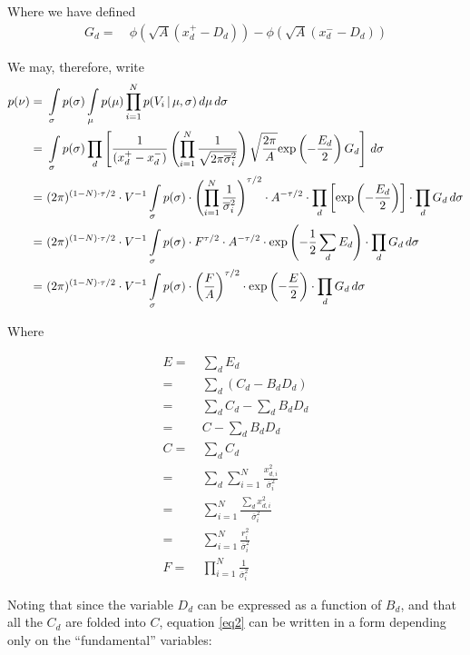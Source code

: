 \documentclass{article}
\newcommand{\sig}{\overline{\sigma}_i}
\newcommand{\eq}{=&\ }
\newcommand{\ints}{\int\displaylimits_\sigma}
\newcommand{\intm}{\int\displaylimits_\mu}
\begin{document}
Where we have defined
\begin{align}
  G_d \eq \phi\left(\sqrt{A}(x_d^+-D_d)\right) - \phi\left(\sqrt{A}(x_d^--D_d)\right)
\end{align}

We may, therefore, write
\begin{align}
  p( \nu ) \eq \ints p(\sigma) \intm p(\mu) \prod_{i=1}^{N} p(V_{i}\,|\,\mu,\sigma)\,d\mu\,d\sigma \nonumber \\
           \eq \ints p(\sigma) \prod_d \left[ \frac{1}{(x_d^+ - x_d^-)} \left(\prod_{i=1}^{N} \frac{1}{\sqrt{2\pi\sig^2}}\right)\sqrt{\frac{2\pi}{A}}\text{exp}\left(-\frac{E_d}{2}\right)G_d \right]\,d\sigma \\  
           \eq (2\pi)^{(1-N)\cdot\tau/2} \cdot V^{-1} \ints p(\sigma) \cdot \left(\prod_{i=1}^{N} \frac{1}{\sig^2}\right)^{\tau/2} \cdot A^{-\tau/2} \cdot \prod_d\left[\text{exp}\left(-\frac{E_d}{2}\right)\right] \cdot \prod_d G_d \,d\sigma \\
           \eq (2\pi)^{(1-N)\cdot\tau/2} \cdot V^{-1} \ints p(\sigma) \cdot F^{\tau/2} \cdot A^{-\tau/2} \cdot \text{exp}\left(-\frac{1}{2}\sum_d E_d\right) \cdot \prod_d G_d \,d\sigma \\
           \eq (2\pi)^{(1-N)\cdot\tau/2} \cdot V^{-1} \ints p(\sigma)\cdot\left(\frac{F}{A}\right)^{\tau/2}\cdot\text{exp}\left(-\frac{E}{2}\right) \cdot \prod_d G_d \,d\sigma \label{eq2}
\end{align}

Where

\begin{align}
  E \eq \sum_d E_d \\
    \eq \sum_d (C_d - B_d D_d) \\
    \eq \sum_d C_d - \sum_d B_d D_d \\
    \eq C - \sum_d B_d D_d \\
  C \eq \sum_d C_d \\
    \eq \sum_d \sum_{i=1}^{N} \frac{x_{d,i}^2}{\sig^2} \\
    \eq \sum_{i=1}^{N} \frac{\sum_d x_{d,i}^2}{\sig^2} \\
    \eq \sum_{i=1}^{N}\frac{r_i^2}{\sig^2} \\
  F \eq \prod_{i=1}^{N} \frac{1}{\sig^2}  
\end{align} 

Noting that since the variable $D_d$ can be expressed as a function of $B_d$, and that all the $C_d$ are folded into $C$, equation \ref{eq2} can be written in a form depending only on the ``fundamental'' variables:
\end{document}
